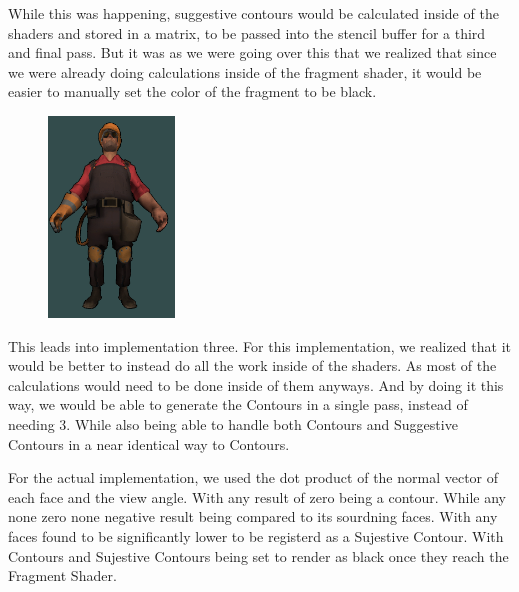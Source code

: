 While this was happening, suggestive contours would be calculated inside of the shaders and stored in a matrix, 
to be passed into the stencil buffer for a third and final pass. But it was as we were going over this that we 
realized that since we were already doing calculations inside of the fragment shader, it would be easier to 
manually set the color of the fragment to be black.

\begin{figure}[h]
    \centering
    \includegraphics[width=0.3\textwidth]{img/ModelD.png}
    \caption{}
    \label{fig-4}
\end{figure}

This leads into implementation three. For this implementation, we realized that it would be better to instead do 
all the work inside of the shaders. As most of the calculations would need to be done inside of them anyways. And 
by doing it this way, we would be able to generate the Contours in a single pass, instead of needing 3. While also 
being able to handle both Contours and Suggestive Contours in a near identical way to Contours.

For the actual implementation, we used the dot product of the normal vector of each face and the view angle. With 
any result of zero being a contour. While any none zero none negative result being compared to its sourdning faces. 
With any faces found to be significantly lower to be registerd as a Sujestive Contour. With Contours and Sujestive 
Contours being set to render as black once they reach the Fragment Shader.

\newpage
{}

